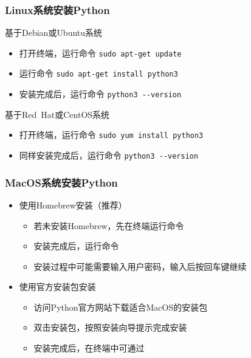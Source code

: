 \begin{frame}[fragile]
	\frametitle{\textrm{Linux}系统安装\textrm{Python}}
	    基于\textrm{Debian}或\textrm{Ubuntu}系统
            \begin{itemize}
		    \item 打开终端，运行命令 \verb|sudo apt-get update|\\
			    {\fontsize{7.2pt}{4.2pt}\selectfont{\textcolor{magenta}{\%更新软件源}}}
               \item 运行命令 \verb|sudo apt-get install python3|\\
		       {\fontsize{7.2pt}{4.2pt}}
                \item 安装完成后，运行命令 \verb|python3 --version|\\
			{\fontsize{7.2pt}{4.2pt}}
            \end{itemize}
	    基于\textrm{Red~Hat}或\textrm{CentOS}系统
            \begin{itemize}
                \item 打开终端，运行命令 \verb|sudo yum install python3|\\
			{\fontsize{7.2pt}{4.2pt}}
                \item 同样安装完成后，运行命令 \verb|python3 --version|\\
			{\fontsize{7.2pt}{4.2pt}}
            \end{itemize}
\end{frame}

\begin{frame}
    \frametitle{MacOS系统安装Python}
    \begin{itemize}
        \item 使用Homebrew安装（推荐）
            \begin{itemize}
                \item 若未安装Homebrew，先在终端运行命令%
                \item 安装完成后，运行命令%
                \item 安装过程中可能需要输入用户密码，输入后按回车键继续
            \end{itemize}
        \item 使用官方安装包安装
            \begin{itemize}
                \item 访问Python官方网站下载适合MacOS的安装包
                \item 双击安装包，按照安装向导提示完成安装
                \item 安装完成后，在终端中可通过%
            \end{itemize}
    \end{itemize}
\end{frame}

